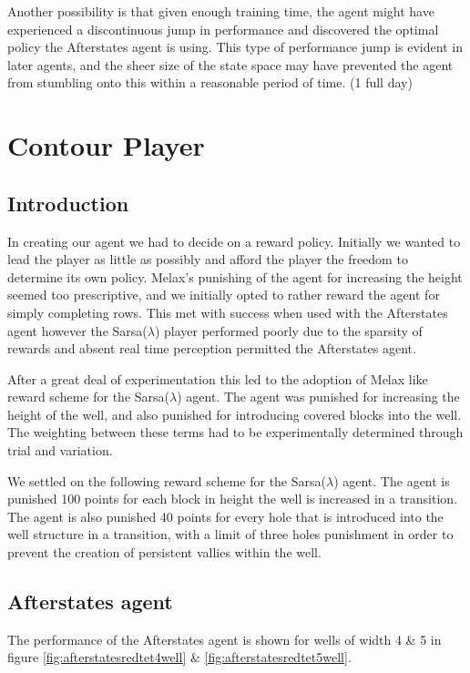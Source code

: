 \documentclass{rucsthesis}
\begin{document}
Another possibility is that given enough training time, the agent might have experienced a discontinuous jump in performance and discovered the optimal policy the Afterstates agent is using. This type of performance jump is evident in later agents, and the sheer size of the state space may have prevented the agent from stumbling onto this within a reasonable period of time. (1 full day)

\chapter{Contour Player}

\section{Introduction}

In creating our agent we had to decide on a reward policy. Initially we wanted to lead the player as little as possibly and afford the player the freedom to determine its own policy. Melax's punishing of the agent for increasing the height seemed too prescriptive, and we initially opted to rather reward the agent for simply completing rows. This met with success when used with the Afterstates agent however the Sarsa($\lambda$) player performed poorly due to the sparsity of rewards and absent real time perception permitted the Afterstates agent.

After a great deal of experimentation this led to the adoption of Melax like reward scheme for the Sarsa($\lambda$) agent. The agent was punished for increasing the height of the well, and also punished for introducing covered blocks into the well. The weighting between these terms had to be experimentally determined through trial and variation.

We settled on the following reward scheme for the Sarsa($\lambda$) agent. The agent is punished 100 points for each block in height the well is increased in a transition. The agent is also punished 40 points for every hole that is introduced into the well structure in a transition, with a limit of three holes punishment in order to prevent the creation of persistent vallies within the well.

\section{Afterstates agent}

The performance of the Afterstates agent is shown for wells of width 4 \& 5 in figure \ref{fig:afterstatesredtet4well} \& \ref{fig:afterstatesredtet5well}.
\end{document}
